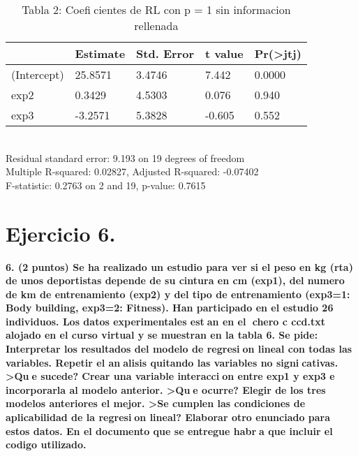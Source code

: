 \documentclass[12pt,spanish]{article}
\begin{document}
\begin{table}[]
\begin{tabular}{@{}lllll@{}}
            & Estimate & Std. Error & t value & Pr(\textgreater jtj) \\ \midrule
(Intercept) & 25.8571     &  3.4746       & 7.442     & 0.0000                  \\
exp2        & 0.3429       & 4.5303        &  0.076     & 0.940                 \\ \bottomrule
exp3        & -3.2571     & 5.3828       & -0.605     & 0.552                   \\ \bottomrule
\end{tabular}
\caption{Tabla 2: Coeficientes de RL con p = 1 sin informacion rellenada}
\end{table}
\\
Residual standard error: 9.193 on 19 degrees of freedom \\
Multiple R-squared: 0.02827, Adjusted R-squared: -0.07402  \\
F-statistic: 0.2763 on 2 and 19, p-value: 0.7615 \\



\part*{Ejercicio 6.}	
		\textbf{6. (2 puntos) Se ha realizado un estudio para ver si el peso en kg (rta) de unos deportistas depende de su cintura en cm (exp1), del numero de km de entrenamiento (exp2) y del tipo de entrenamiento (exp3=1: Body building, exp3=2: Fitness). Han participado en el estudio 26 individuos. Los datos experimentales estan en el chero c ccd.txt alojado en el curso virtual y se muestran en la tabla 6.
Se pide:
Interpretar los resultados del modelo de regresion lineal con todas las variables.
Repetir el analisis quitando las variables no signicativas. >Que sucede?
Crear una variable interaccion entre exp1 y exp3 e incorporarla al modelo anterior. >Que ocurre?
Elegir de los tres modelos anteriores el mejor. >Se cumplen las condiciones de aplicabilidad de la
regresion lineal?
Elaborar otro enunciado para estos datos.
En el documento que se entregue habra que incluir el codigo utilizado.}
\end{document}
